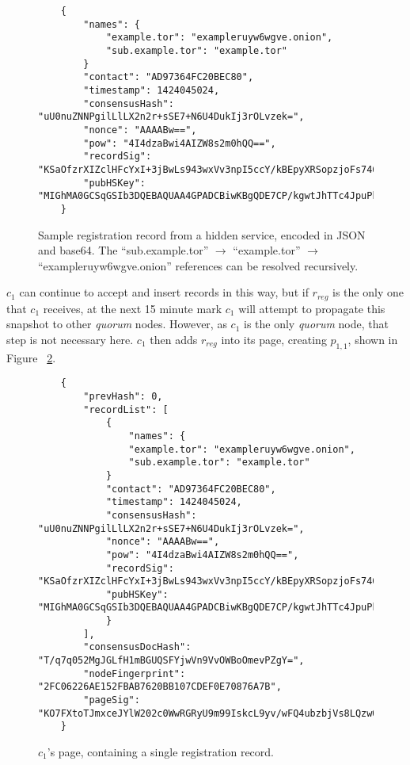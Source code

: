 \begin{figure}
	\begin{lstlisting}
	{
		"names": {
			"example.tor": "exampleruyw6wgve.onion",
			"sub.example.tor": "example.tor"
		}
		"contact": "AD97364FC20BEC80",
		"timestamp": 1424045024,
		"consensusHash": "uU0nuZNNPgilLlLX2n2r+sSE7+N6U4DukIj3rOLvzek=",
		"nonce": "AAAABw==",
		"pow": "4I4dzaBwi4AIZW8s2m0hQQ==",
		"recordSig": 	"KSaOfzrXIZclHFcYxI+3jBwLs943wxVv3npI5ccY/kBEpyXRSopzjoFs746n0tJqUpdY4Kbe6DBwERaN7ELmSSK9Pu6q8QeKzNAh+QOnKl0fKBN7fqowjkQ3ktFkR0Vuox9WrrbNTMa4+up0Np52hlbKA3zSRz4fbR9NVlh6uuQ=",
		"pubHSKey": "MIGhMA0GCSqGSIb3DQEBAQUAA4GPADCBiwKBgQDE7CP/kgwtJhTTc4JpuPkvA7Ln9wgc+fgTKgkyUp1zusxgUAn1c1MGx4YhO42KPB7dyZOf3pcRk94XsYFY1ULkF2+tf9KdNe7GFzJyMFCQENnUcVXbcwLH4vAeiGK7R/nScbCbyc9LT+VE1fbKchTL1QzLVBLqJTxhR+9YPi8x+QIFAdZ8BJs="
	}
	\end{lstlisting}
	\caption{Sample registration record from a hidden service, encoded in JSON and base64. The ``sub.example.tor'' $ \to $ ``example.tor'' $ \to $ ``exampleruyw6wgve.onion'' references can be resolved recursively.}
	\label{fig:sampleRecord}
\end{figure}

$ c_{1} $ can continue to accept and insert records in this way, but if $ r_{reg} $ is the only one that $ c_{1} $ receives, at the next 15 minute mark $ c_{1} $ will attempt to propagate this snapshot to other \emph{quorum} nodes. However, as $ c_{1} $ is the only \emph{quorum} node, that step is not necessary here. $ c_{1} $ then adds $ r_{reg} $ into its page, creating $ p_{1,1} $, shown in Figure ~\ref{fig:c1page}.

\begin{figure}
	\begin{lstlisting}
	{
		"prevHash": 0,
		"recordList": [
			{
				"names": {
				"example.tor": "exampleruyw6wgve.onion",
				"sub.example.tor": "example.tor"
			}
			"contact": "AD97364FC20BEC80",
			"timestamp": 1424045024,
			"consensusHash": "uU0nuZNNPgilLlLX2n2r+sSE7+N6U4DukIj3rOLvzek=",
			"nonce": "AAAABw==",
			"pow": "4I4dzaBwi4AIZW8s2m0hQQ==",
			"recordSig": 	"KSaOfzrXIZclHFcYxI+3jBwLs943wxVv3npI5ccY/kBEpyXRSopzjoFs746n0tJqUpdY4Kbe6DBwERaN7ELmSSK9Pu6q8QeKzNAh+QOnKl0fKBN7fqowjkQ3ktFkR0Vuox9WrrbNTMa4+up0Np52hlbKA3zSRz4fbR9NVlh6uuQ=",
			"pubHSKey": "MIGhMA0GCSqGSIb3DQEBAQUAA4GPADCBiwKBgQDE7CP/kgwtJhTTc4JpuPkvA7Ln9wgc+fgTKgkyUp1zusxgUAn1c1MGx4YhO42KPB7dyZOf3pcRk94XsYFY1ULkF2+tf9KdNe7GFzJyMFCQENnUcVXbcwLH4vAeiGK7R/nScbCbyc9LT+VE1fbKchTL1QzLVBLqJTxhR+9YPi8x+QIFAdZ8BJs="
			}
		],
		"consensusDocHash": "T/q7q052MgJGLfH1mBGUQSFYjwVn9VvOWBoOmevPZgY=",
		"nodeFingerprint": "2FC06226AE152FBAB7620BB107CDEF0E70876A7B",
		"pageSig": "KO7FXtoTJmxceJYlW202c0WwRGRyU9m99IskcL9yv/wFQ4ubzbjVs8LQzwQub9kDJ8Htpc9rRZvneRRbusFv1nvaeJw+WgRt+Tck0uapndHKYaQcK3XTIFYdmT1lLm7QxSKjnIxgBkwKT0QWdGLUhuRgGe5CXmqrPeDfU/gsgLs="
	}
	\end{lstlisting}
	\caption{$ c_{1} $'s page, containing a single registration record.}
	\label{fig:c1page}
\end{figure}

